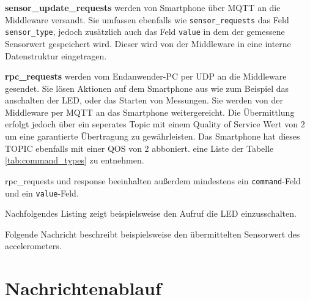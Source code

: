 \documentclass[11pt,a4paper]{report}
\begin{document}
\textbf{sensor\_update\_requests} werden von Smartphone über MQTT an die Middleware versandt.
Sie umfassen ebenfalls wie \texttt{sensor\_requests} das Feld \texttt{sensor\_type}, jedoch zusätzlich auch das Feld \texttt{value} in dem der gemessene Sensorwert gespeichert wird.
Dieser wird von der Middleware in eine interne Datenstruktur eingetragen.

\textbf{rpc\_requests} werden vom Endanwender-PC per UDP an die Middleware gesendet.
Sie lösen Aktionen auf dem Smartphone aus wie zum Beispiel das anschalten der LED, oder das Starten von Messungen.
Sie werden von der Middleware per MQTT an das Smartphone weitergereicht.
Die Übermittlung erfolgt jedoch über ein seperates Topic mit einem Quality of Service Wert von 2 um eine garantierte Übertragung zu gewährleisten.
Das Smartphone hat dieses TOPIC ebenfalls mit einer QOS von 2 abboniert.
eine Liste der Tabelle \ref{tab:command_types} zu entnehmen.




rpc\_requests und response beeinhalten außerdem mindestens ein \texttt{command}-Feld und ein \texttt{value}-Feld.

Nachfolgendes Listing zeigt beispielsweise den Aufruf die LED einzusschalten.


Folgende Nachricht beschreibt beispielsweise den übermittelten Sensorwert des accelerometers.


\section{Nachrichtenablauf}
\end{document}
